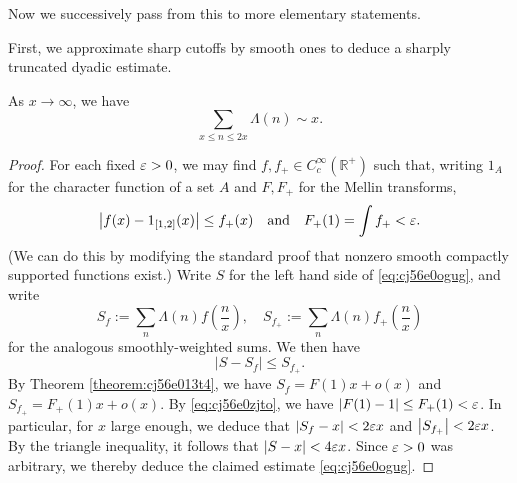 \documentclass[reqno]{amsart}  \numberwithin{theorem}{section} \numberwithin{equation}{section}
\begin{document}
Now we successively pass from this to more elementary statements.

First, we approximate sharp cutoffs by smooth ones to deduce a sharply truncated dyadic estimate.
\begin{theorem}\label{theorem:cj56e4c1fl}
  As $x \rightarrow \infty$, we have
  \begin{equation}\label{eq:cj56e0ogug}
    \sum_{x \leq n \leq 2 x} \Lambda(n) \sim x.
  \end{equation}
\end{theorem}
\begin{proof}
  For each fixed $\varepsilon > 0$, we may find $f, f_+ \in C_c^\infty(\mathbb{R}^+)$ such that, writing $1_{A}$ for the character function of a set $A$ and $F, F_+ $ for the Mellin transforms,
  \begin{equation}\label{eq:cj56e0zjto}
    \left\lvert f(x) - 1_{[1,2]}(x) \right\rvert \leq f_+(x) \quad
    \text{and} \quad
    F_+(1) = \int  f_+ < \varepsilon.
  \end{equation}
  (We can do this by modifying the standard proof that nonzero smooth compactly supported functions exist.)  Write $S$ for the left hand side of \eqref{eq:cj56e0ogug}, and write
  \begin{equation*}
    S_{f} := \sum_{n} \Lambda (n) f \left( \frac{n}{x} \right),
    \quad S_{f_+} := \sum_{n} \Lambda (n) f_+ \left( \frac{n}{x} \right)
  \end{equation*}
  for the analogous smoothly-weighted sums.  We then have
  \begin{equation}\label{eq:cj56e03cbi}
    \left\lvert S - S_f
    \right\rvert
    \leq S_{f_+}.
  \end{equation}
  By Theorem \ref{theorem:cj56e013t4}, we have $S_f = F(1) x + o(x)$ and $S_{f_+} = F_+(1) x + o(x)$.  By \eqref{eq:cj56e0zjto}, we have $\left\lvert F(1) - 1 \right\rvert \leq F_+(1) < \varepsilon$.  In particular, for $x$ large enough, we deduce that $\lvert S_f - x \rvert < 2 \varepsilon x$ and $\left\lvert S_{f_+} \right\rvert < 2 \varepsilon x$.  By the triangle inequality, it follows that $\lvert S - x \rvert < 4 \varepsilon x$.  Since $\varepsilon > 0$ was arbitrary, we thereby deduce the claimed estimate \eqref{eq:cj56e0ogug}.
\end{proof}
\end{document}

